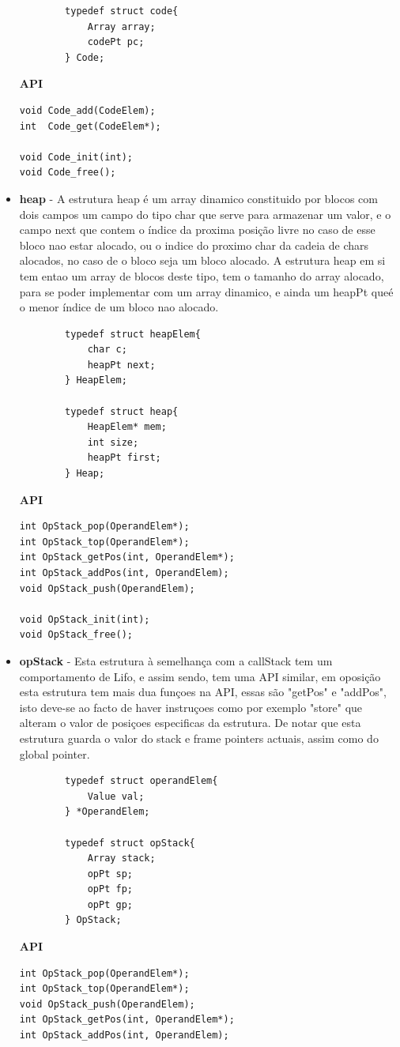 \documentclass{report}
\begin{document}
\begin{itemize}
\begin{verbatim}
		typedef struct code{
		    Array array;
		    codePt pc;
		} Code;
	\end{verbatim}
        \textbf{API}
	\begin{verbatim}
void Code_add(CodeElem);
int  Code_get(CodeElem*);

void Code_init(int);
void Code_free();
	\end{verbatim}


	\item \textbf{heap} - A estrutura heap é um array dinamico constituido por blocos com dois campos um campo do tipo char que serve para armazenar um valor, e o campo next que contem o índice da proxima posição livre no caso de esse bloco nao estar alocado, ou o indice do proximo char da cadeia de chars alocados, no caso de o bloco seja um bloco alocado. A estrutura heap em si tem entao um array de blocos deste tipo, tem o tamanho do array alocado, para se poder implementar com um array dinamico, e ainda um heapPt queé o menor índice de um bloco nao alocado.
	\begin{verbatim}
		typedef struct heapElem{
		    char c;
		    heapPt next;
		} HeapElem;

		typedef struct heap{
		    HeapElem* mem;
		    int size;
		    heapPt first;
		} Heap;
	\end{verbatim}
        \textbf{API}
	\begin{verbatim}
int OpStack_pop(OperandElem*);
int OpStack_top(OperandElem*);
int OpStack_getPos(int, OperandElem*);
int OpStack_addPos(int, OperandElem);
void OpStack_push(OperandElem);

void OpStack_init(int);
void OpStack_free();
	\end{verbatim}


	\item \textbf{opStack} - Esta estrutura à semelhança com a callStack tem um comportamento de Lifo, e assim sendo, tem uma API similar, em oposição esta estrutura tem mais dua funçoes na API, essas são "getPos" e "addPos", isto deve-se ao facto de haver instruçoes como por exemplo "store" que alteram o valor de posiçoes  especificas da estrutura. De notar que esta estrutura guarda o valor do stack e frame pointers actuais, assim como do global pointer.
	\begin{verbatim}
		typedef struct operandElem{
		    Value val;
		} *OperandElem;

		typedef struct opStack{
		    Array stack;
		    opPt sp;
		    opPt fp;
		    opPt gp;
		} OpStack;
	\end{verbatim}
        \textbf{API}
	\begin{verbatim}
int OpStack_pop(OperandElem*);
int OpStack_top(OperandElem*);
void OpStack_push(OperandElem);
int OpStack_getPos(int, OperandElem*);
int OpStack_addPos(int, OperandElem);


\end{verbatim}
\end{itemize}
\end{document}
